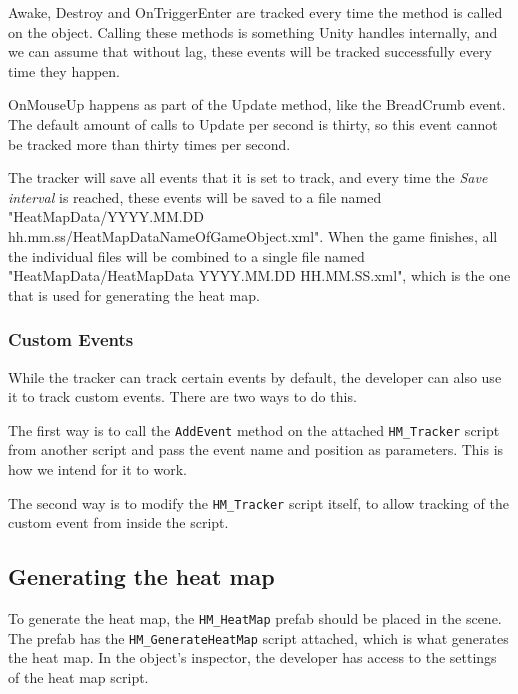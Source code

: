 Awake, Destroy and OnTriggerEnter are tracked every time the method is called on the object. Calling these methods is something Unity handles internally, and we can assume that without lag, these events will be tracked successfully every time they happen.

OnMouseUp happens as part of the Update method, like the BreadCrumb event. The default amount of calls to Update per second is thirty, so this event cannot be tracked more than thirty times per second.

The tracker will save all events that it is set to track, and every time the \textit{Save interval} is reached, these events will be saved to a file named "HeatMapData/YYYY.MM.DD hh.mm.ss/HeatMapDataNameOfGameObject.xml". When the game finishes, all the individual files will be combined to a single file named "HeatMapData/HeatMapData YYYY.MM.DD HH.MM.SS.xml", which is the one that is used for generating the heat map.

\subsubsection*{Custom Events}
\label{HowToUse_Tracking_Custom}

While the tracker can track certain events by default, the developer can also use it to track custom events. There are two ways to do this.

The first way is to call the \texttt{AddEvent} method on the attached \texttt{HM\_Tracker} script from another script and pass the event name and position as parameters. This is how we intend for it to work.

The second way is to modify the \texttt{HM\_Tracker} script itself, to allow tracking of the custom event from inside the script.

\subsection{Generating the heat map}
\label{HowToUse_Generating}

To generate the heat map, the \texttt{HM\_HeatMap} prefab should be placed in the scene. The prefab has the \texttt{HM\_GenerateHeatMap} script attached, which is what generates the heat map. In the object's inspector, the developer has access to the settings of the heat map script.


